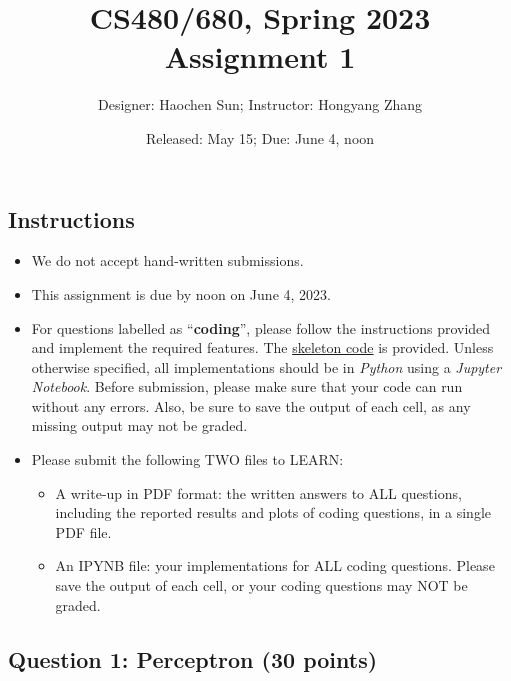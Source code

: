 \documentclass{article}
\title{\large CS480/680, Spring 2023\\\huge Assignment 1}
\author{Designer: Haochen Sun; Instructor: Hongyang Zhang}
\date{Released: May 15; Due: June 4, noon}
\begin{document}
\maketitle

\subsection*{Instructions}

\begin{itemize}
    \item We do not accept hand-written submissions.
    \item This assignment is due by noon on June 4, 2023.
    \item For questions labelled as ``\textbf{coding}'', please follow the instructions provided and implement the required features. The \href{https://colab.research.google.com/gist/jvhs0706/3f0778cc9fbbf4a077f752ea1edf956b/cs480-680-assignment1-coding.ipynb}{skeleton code} is provided. Unless otherwise specified, all implementations should be in \emph{Python} using a \emph{Jupyter Notebook}. Before submission, please make sure that your code can run without any errors. Also, be sure to save the output of each cell, as any missing output may not be graded.
    \item Please submit the following TWO files to LEARN:
    \begin{itemize}
        \item A write-up in PDF format: the written answers to ALL questions, including the reported results and plots of coding questions, in a single PDF file.
        \item An IPYNB file: your implementations for ALL coding questions. Please save the output of each cell, or your coding questions may NOT be graded.
    \end{itemize}
\end{itemize}

\newpage
\subsection*{Question 1: Perceptron (30 points)}
\end{document}
